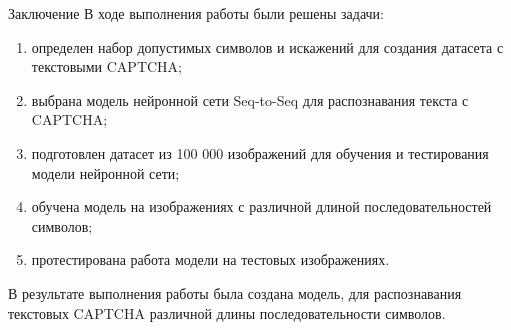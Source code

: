 \documentclass[12pt,a4paper,mathserif]{beamer}
\begin{document}
\begin{frame}{Заключение}
    \setlength{\parindent}{0.5cm}
    В ходе выполнения работы были решены задачи:
    \begin{enumerate}
        \item определен набор допустимых символов и искажений для создания датасета с текстовыми CAPTCHA;
        \item выбрана модель нейронной сети Seq-to-Seq для распознавания текста с CAPTCHA;
        \item подготовлен датасет из 100 000 изображений для обучения и тестирования модели нейронной сети;
        \item обучена модель на изображениях с различной длиной последовательностей символов;
        \item протестирована работа модели на тестовых изображениях.
    \end{enumerate}
    
    В результате выполнения работы была создана модель, для распознавания текстовых CAPTCHA различной длины последовательности символов.
\end{frame}
\end{document}
